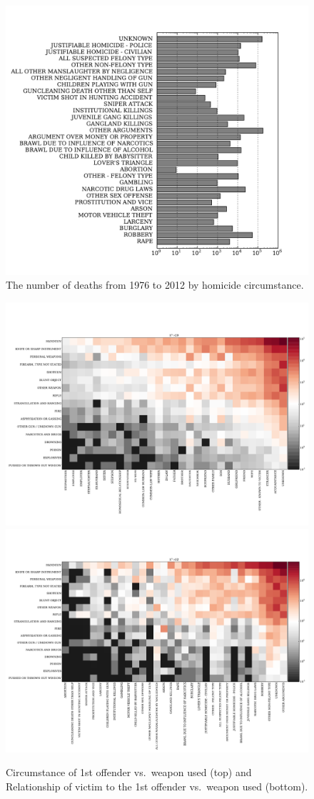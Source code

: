 \begin{multicols}{2}
\begin{figure}[H]
  \centering
    \includegraphics[width=\linewidth]{images/circumstance.pdf}
  \caption{The number of deaths from 1976 to 2012 by homicide circumstance.}
\end{figure}

\begin{figure}
  \centering
    \includegraphics[width=0.8\linewidth]{images/all_data_relation.pdf}
    \includegraphics[width=0.8\linewidth]{images/all_data_circum.pdf}
  \caption{Circumstance of 1st offender vs.~weapon used (top) and Relationship of victim to the 1st offender vs.~weapon used (bottom).}
\end{figure}


\end{multicols}
